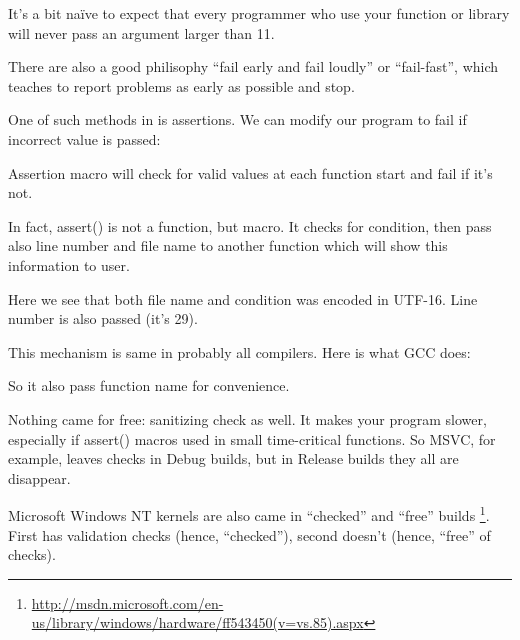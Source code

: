 It's a bit naïve to expect that every programmer who use your function or library will never pass
an argument larger than 11.

There are also a good philisophy ``fail early and fail loudly'' or ``fail-fast'', which teaches to report
problems as early as possible and stop.

One of such methods in \CCpp is assertions.
We can modify our program to fail if incorrect value is passed:



Assertion macro will check for valid values at each function start and fail if it's not.



In fact, assert() is not a function, but macro. It checks for condition, then pass also line number and file
name to another function which will show this information to user.

Here we see that both file name and condition was encoded in UTF-16.
Line number is also passed (it's 29).

This mechanism is same in probably all compilers.
Here is what GCC does:



So it also pass function name for convenience.

Nothing came for free: sanitizing check as well.
It makes your program slower, especially if assert() macros used in small time-critical functions.
So MSVC, for example, leaves checks in Debug builds, but in Release builds they all are disappear.
 
Microsoft \gls{Windows NT} kernels are also came in ``checked'' and ``free'' builds
\footnote{\url{http://msdn.microsoft.com/en-us/library/windows/hardware/ff543450(v=vs.85).aspx}}.
First has validation checks (hence, ``checked''), second doesn't (hence, ``free'' of checks).
\fi
